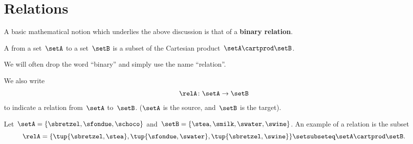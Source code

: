 
\section{Relations}
\label{sec:connection-relations}

A basic mathematical notion which underlies the above discussion is that of a \textbf{binary relation}.

\begin{ctdefinition}
    \label{def:binary-relation}
    A \emph{} from a set~$\setA$ to a set~$\setB$ is a subset of the Cartesian product~$\setA\cartprod \setB$.
\end{ctdefinition}

We will often drop the word ``binary'' and simply use the name ``relation''.

We also write
\begin{equation*}
    \relA \colon \setA \to \setB
\end{equation*}
to indicate a relation from~$\setA$ to~$\setB$.
($\setA$ is the source, and~$\setB$ is the target).

\begin{marginfigure}
    \centering
    \caption{}
    \label{fig:example_rel}
\end{marginfigure}

\begin{example}
    \label{exa:simple-rel}
    Let~$\setA = \{ \sbretzel, \sfondue, \schoco \}$ and~$\setB = \{ \stea, \smilk, \swater, \swine \}$.
    An example of a relation is the subset
    \begin{equation*}
        \relA = \{ \tup{\sbretzel, \stea}, \tup{\sfondue, \swater}, \tup{\sbretzel, \swine} \} \setsubseteq \setA \cartprod \setB.
    \end{equation*}
\end{example}

